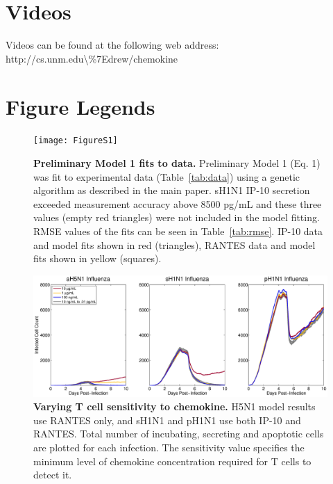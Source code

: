 \documentclass[preprint,10pt,authoryear]{article}
\begin{document}
\section*{Videos}

Videos can be found at the following web address: http://cs.unm.edu\textbackslash\%7Edrew/chemokine




\pagebreak

\section*{Figure Legends}



\setcounter{figure}{0}
\renewcommand{\thefigure}{S\arabic{figure}}

\begin{figure}[!ht]
\begin{center}
 \texttt{[image: FigureS1]}
 \end{center}
\caption{{\bf Preliminary Model 1 fits to data.}  Preliminary Model 1 (Eq. 1) was fit to experimental data (Table~\ref{tab:data}) using a genetic algorithm as described in the main paper.  sH1N1 IP-10 secretion exceeded measurement accuracy above 8500 pg/mL and these three values (empty red triangles) were not included in the model fitting.  RMSE values of the fits can be seen in Table~\ref{tab:rmse}.  IP-10 data and model fits shown in red (triangles), RANTES data and model fits shown in yellow (squares).} 
 \label{fig:fits}
\end{figure}


\begin{figure}[!ht]
\begin{center}
 \includegraphics[width=\textwidth]{Figure_S2}
 \end{center}
\caption{{\bf Varying T cell sensitivity to chemokine.}  H5N1 model results use RANTES  only, and sH1N1 and pH1N1 use both IP-10 and RANTES. Total number of incubating, secreting and apoptotic cells are plotted for each infection.  The sensitivity value specifies the minimum level of chemokine concentration required for T cells to detect it. } 
 \label{fig:sensitivity}
\end{figure}
\end{document}
